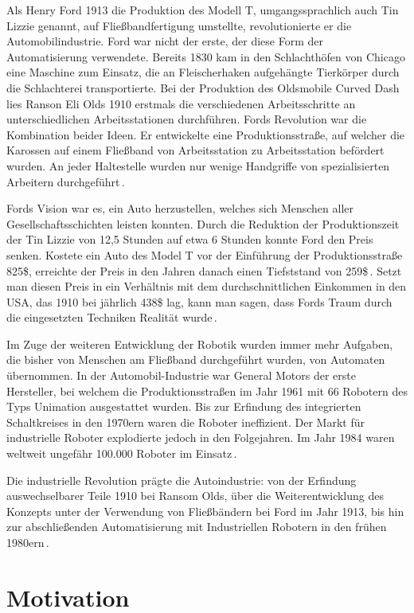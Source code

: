 \documentclass[12pt,oneside,a4paper,parskip]{scrbook}
\begin{document}
Als Henry Ford 1913 die Produktion des Modell T, umgangssprachlich auch Tin Lizzie genannt, auf Fließbandfertigung umstellte, revolutionierte er die Automobilindustrie. Ford war nicht der erste, der diese Form der Automatisierung verwendete. Bereits 1830 kam in den Schlachthöfen von Chicago eine Maschine zum Einsatz, die an Fleischerhaken aufgehängte Tierkörper durch die Schlachterei transportierte. Bei der Produktion des Oldsmobile Curved Dash lies Ranson Eli Olds 1910 erstmals die verschiedenen Arbeitsschritte an unterschiedlichen Arbeitsstationen durchführen. Fords Revolution war die Kombination beider Ideen. Er entwickelte eine Produktionsstraße, auf welcher die Karossen auf einem Fließband von Arbeitsstation zu Arbeitsstation befördert wurden. An jeder Haltestelle wurden nur wenige Handgriffe von spezialisierten Arbeitern durchgeführt\,\cite{sagerso2008}.

Fords Vision war es, ein Auto herzustellen, welches sich Menschen aller Gesellschaftsschichten leisten konnten. Durch die Reduktion der Produktionszeit der Tin Lizzie von 12,5 Stunden auf etwa 6 Stunden konnte Ford den Preis senken. Kostete ein Auto des Model T vor der Einführung der Produktionsstraße 825\$, erreichte der Preis in den Jahren danach einen Tiefststand von 259\$\,\cite{reichlesz2010}. Setzt man diesen Preis in ein Verhältnis mit dem durchschnittlichen Einkommen in den USA, das 1910 bei jährlich 438\$ lag, kann man sagen, dass Fords Traum durch die eingesetzten Techniken Realität wurde\,\cite{usembassyodnumbers}.

Im Zuge der weiteren Entwicklung der Robotik wurden immer mehr Aufgaben, die bisher von Menschen am Fließband durchgeführt wurden, von Automaten übernommen. In der Automobil-Industrie war General Motors der erste Hersteller, bei welchem die Produktionsstraßen im Jahr 1961 mit 66 Robotern des Typs Unimation ausgestattet wurden. Bis zur Erfindung des integrierten Schaltkreises in den 1970ern waren die Roboter ineffizient. Der Markt für industrielle Roboter explodierte jedoch in den Folgejahren. Im Jahr 1984 waren weltweit ungefähr 100.000 Roboter im Einsatz\,\cite{czaeis2000, wallen2008}.

Die industrielle Revolution prägte die Autoindustrie: von der Erfindung auswechselbarer Teile 1910 bei Ransom Olds, über die Weiterentwicklung des Konzepts unter der Verwendung von Fließbändern bei Ford im Jahr 1913, bis hin zur abschließenden Automatisierung mit Industriellen Robotern in den frühen 1980ern\,\cite{czaeis2000}.

\section{Motivation}
\end{document}
